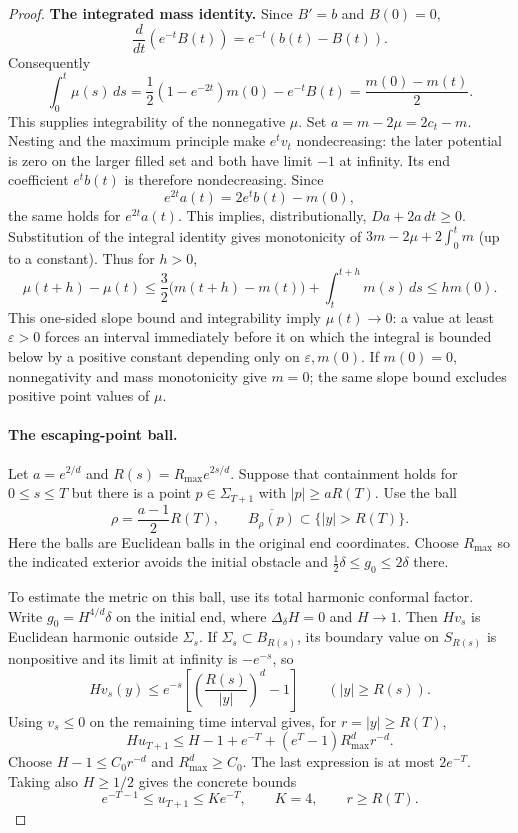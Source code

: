 \begin{proof}
\textbf{The integrated mass identity.}\quad
Since $B'=b$ and $B(0)=0$,
\[
 \frac{d}{dt}(e^{-t}B(t))=e^{-t}(b(t)-B(t)).
\]
Consequently
\[
 \int_0^t\mu(s)\,ds
 =\frac12(1-e^{-2t})m(0)-e^{-t}B(t)
 =\frac{m(0)-m(t)}2.
\]
This supplies integrability of the nonnegative
$\mu$. Set $a=m-2\mu=2c_t-m$.
Nesting and the maximum principle make $e^tv_t$ nondecreasing:
the later potential is zero on the larger filled set and both have
limit $-1$ at infinity. Its end coefficient $e^tb(t)$ is therefore
nondecreasing. Since
\[
 e^{2t}a(t)=2e^tb(t)-m(0),
\]
the same holds for $e^{2t}a(t)$. This implies, distributionally,
$Da+2a\,dt\geq0$. Substitution of the integral identity gives
monotonicity of $3m-2\mu+2\int_0^t m$ (up to a constant).
Thus for $h>0$,
\[
 \mu(t+h)-\mu(t)
 \leq\frac32\bigl(m(t+h)-m(t)\bigr)
       +\int_t^{t+h}m(s)\,ds
 \leq h m(0).
\]
This one-sided slope bound and integrability imply
$\mu(t)\to0$: a value at least $\varepsilon>0$ forces an
interval immediately before it on which the integral is bounded below
by a positive constant depending only on $\varepsilon,m(0)$.
If $m(0)=0$, nonnegativity and mass monotonicity give $m=0$;
the same slope bound excludes positive point values of $\mu$.

\paragraph{The escaping-point ball.}
Let $a=e^{2/d}$ and $R(s)=R_{\max}e^{2s/d}$. Suppose
that containment holds for $0\le s\le T$ but there is a point
$p\in\Sigma_{T+1}$ with $|p|\geq aR(T)$. Use the ball
\[
 \rho=\frac{a-1}{2}R(T),\qquad
 \overline{B_\rho(p)}\subset\{|y|>R(T)\}.
\]
Here the balls are Euclidean balls in the original end coordinates.
Choose $R_{\max}$ so the indicated exterior avoids the initial obstacle
and $\tfrac12\delta\leq g_0\leq2\delta$ there.

To estimate the metric on this ball, use its total harmonic conformal factor.
Write $g_0=H^{4/d}\delta$ on the initial end, where $\Delta_\delta H=0$
and $H\to1$. Then $Hv_s$ is Euclidean harmonic outside $\Sigma_s$.
If $\Sigma_s\subset B_{R(s)}$, its boundary value on $S_{R(s)}$
is nonpositive and its limit at infinity is $-e^{-s}$, so
\[
 Hv_s(y)\leq e^{-s}\left[\left(\frac{R(s)}{|y|}\right)^d-1\right]
 \qquad (|y|\geq R(s)).
\]
Using $v_s\leq0$ on the remaining time interval gives, for $r=|y|\geq R(T)$,
\[
 H u_{T+1}\leq H-1+e^{-T}+(e^T-1)R_{\max}^d r^{-d}.
\]
Choose $H-1\leq C_0r^{-d}$ and $R_{\max}^d\geq C_0$.
The last expression is at most $2e^{-T}$. Taking also $H\geq1/2$
gives the concrete bounds
\[
 e^{-T-1}\leq u_{T+1}\leq K e^{-T},\qquad K=4,
 \qquad r\geq R(T).
\]


\end{proof}
